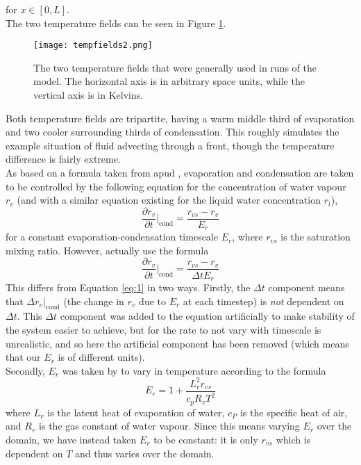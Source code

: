\documentclass[11pt]{article}
\begin{document}
for $x\in[0,L]$. \\
The two temperature fields can be seen in Figure \ref{fig:tempfields}.
\begin{figure}[H]
\centering
\texttt{[image: tempfields2.png]}
\caption{The two temperature fields that were generally used in runs of the model. The horizontal axis is in arbitrary space units, while the vertical axis is in Kelvins.}
\label{fig:tempfields}
\end{figure}
Both temperature fields are tripartite, having a warm middle third of evaporation and two cooler surrounding thirds of condensation. This roughly simulates the example situation of fluid advecting through a front, though the temperature difference is fairly extreme. \\
As based on a formula taken from \citet[p.~2920]{BF2002} apud \citet{RH1983}, evaporation and condensation are taken to be controlled by the following equation for the concentration of water vapour $r_v$ (and with a similar equation existing for the liquid water concentration $r_l$),
\begin{equation} \label{eq:1}
\frac{\partial r_v}{\partial t}|_{\text{cond}}=\frac{r_{vs} - r_v}{E_r}
\end{equation}
for a constant evaporation-condensation timescale $E_r$, where $r_{vs}$ is the saturation mixing ratio. However, \citeauthor{BF2002} actually use the formula
\begin{equation}
\frac{\partial r_v}{\partial t}|_{\text{cond}}=\frac{r_{vs} - r_v}{\Delta t E_r}	\label{eq:artificial}
\end{equation}
This differs from Equation \ref{eq:1} in two ways. Firstly, the $\Delta t$ component means that $\Delta r_v|_{\text{cond}}$ (the change in $r_v$ due to $E_r$ at each timestep) is \emph{not} dependent on $\Delta t$. This $\Delta t$ component was added to the equation artificially to make stability of the system easier to achieve, but for the rate to not vary with timescale is unrealistic, and so here the artificial component has been removed (which means that our $E_r$ is of different units). \\
Secondly, $E_r$ was taken by \citeauthor{BF2002} to vary in temperature according to the formula
\begin{equation}
E_r = 1+\frac{L_v^2r_{vs}}{c_pR_vT^2} \label{eq:condrate}
\end{equation}
where $L_v$ is the latent heat of evaporation of water, $c_P$ is the specific heat of air, and $R_v$ is the gas constant of water vapour. Since this means varying $E_r$ over the domain, we have instead taken $E_r$ to be constant: it is only $r_{vs}$ which is dependent on $T$ and thus varies over the domain. \\
\end{document}
